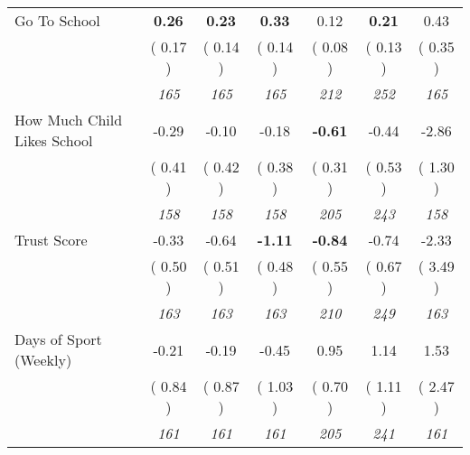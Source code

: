 \begin{tabular}{l c c c c c c}
Go To School & \textbf{      0.26 } & \textbf{      0.23 } & \textbf{      0.33 } &      0.12 & \textbf{      0.21 } &      0.43 \\
& (     0.17 ) & (     0.14 ) & (     0.14 ) & (     0.08 ) & (     0.13 ) & (     0.35 ) \\
& \textit{ 165 } & \textit{ 165 } & \textit{ 165 } & \textit{ 212 } & \textit{ 252 } & \textit{ 165 } \\
How Much Child Likes School &     -0.29 &     -0.10 &     -0.18 & \textbf{     -0.61 } &     -0.44 &     -2.86 \\
& (     0.41 ) & (     0.42 ) & (     0.38 ) & (     0.31 ) & (     0.53 ) & (     1.30 ) \\
& \textit{ 158 } & \textit{ 158 } & \textit{ 158 } & \textit{ 205 } & \textit{ 243 } & \textit{ 158 } \\
Trust Score &     -0.33 &     -0.64 & \textbf{     -1.11 } & \textbf{     -0.84 } &     -0.74 &     -2.33 \\
& (     0.50 ) & (     0.51 ) & (     0.48 ) & (     0.55 ) & (     0.67 ) & (     3.49 ) \\
& \textit{ 163 } & \textit{ 163 } & \textit{ 163 } & \textit{ 210 } & \textit{ 249 } & \textit{ 163 } \\
Days of Sport (Weekly) &     -0.21 &     -0.19 &     -0.45 &      0.95 &      1.14 &      1.53 \\
& (     0.84 ) & (     0.87 ) & (     1.03 ) & (     0.70 ) & (     1.11 ) & (     2.47 ) \\
& \textit{ 161 } & \textit{ 161 } & \textit{ 161 } & \textit{ 205 } & \textit{ 241 } & \textit{ 161 } \\
\bottomrule
\end{tabular}
